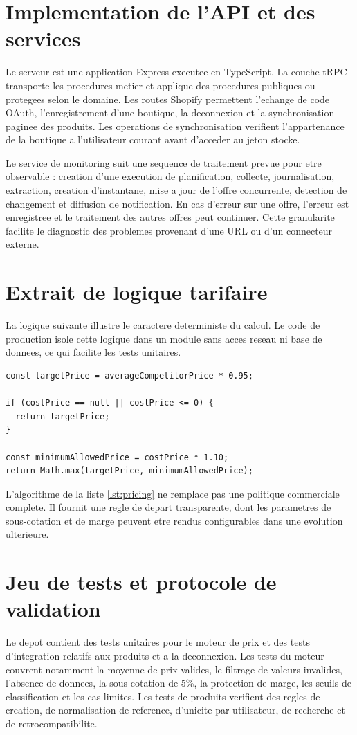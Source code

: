 \documentclass[12pt,a4paper,oneside]{report}
\begin{document}
\section{Implementation de l'API et des services}
Le serveur est une application Express executee en TypeScript. La couche tRPC transporte les procedures metier et applique des procedures publiques ou protegees selon le domaine. Les routes Shopify permettent l'echange de code OAuth, l'enregistrement d'une boutique, la deconnexion et la synchronisation paginee des produits. Les operations de synchronisation verifient l'appartenance de la boutique a l'utilisateur courant avant d'acceder au jeton stocke.

Le service de monitoring suit une sequence de traitement prevue pour etre observable : creation d'une execution de planification, collecte, journalisation, extraction, creation d'instantane, mise a jour de l'offre concurrente, detection de changement et diffusion de notification. En cas d'erreur sur une offre, l'erreur est enregistree et le traitement des autres offres peut continuer. Cette granularite facilite le diagnostic des problemes provenant d'une URL ou d'un connecteur externe.

\section{Extrait de logique tarifaire}
La logique suivante illustre le caractere deterministe du calcul. Le code de production isole cette logique dans un module sans acces reseau ni base de donnees, ce qui facilite les tests unitaires.
\begin{lstlisting}[style=typescript,caption={Pseudo-code simplifie de la protection de marge},label={lst:pricing}]
const targetPrice = averageCompetitorPrice * 0.95;

if (costPrice == null || costPrice <= 0) {
  return targetPrice;
}

const minimumAllowedPrice = costPrice * 1.10;
return Math.max(targetPrice, minimumAllowedPrice);
\end{lstlisting}

L'algorithme de la liste \ref{lst:pricing} ne remplace pas une politique commerciale complete. Il fournit une regle de depart transparente, dont les parametres de sous-cotation et de marge peuvent etre rendus configurables dans une evolution ulterieure.

\section{Jeu de tests et protocole de validation}
Le depot contient des tests unitaires pour le moteur de prix et des tests d'integration relatifs aux produits et a la deconnexion. Les tests du moteur couvrent notamment la moyenne de prix valides, le filtrage de valeurs invalides, l'absence de donnees, la sous-cotation de 5\%, la protection de marge, les seuils de classification et les cas limites. Les tests de produits verifient des regles de creation, de normalisation de reference, d'unicite par utilisateur, de recherche et de retrocompatibilite.
\end{document}
